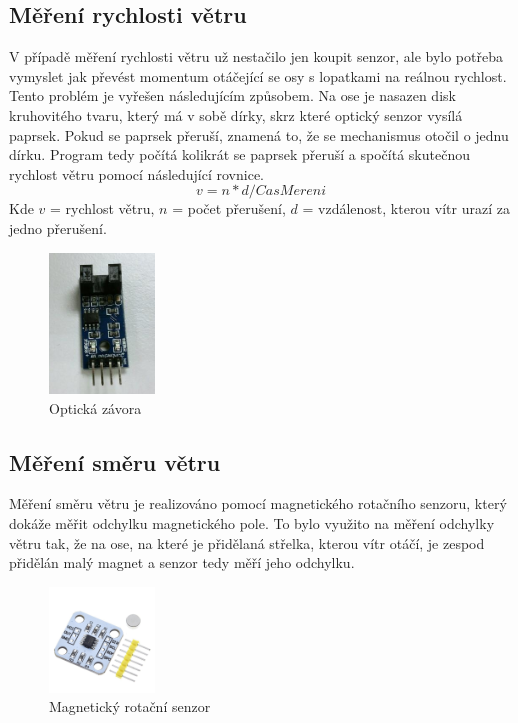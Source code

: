 \subsection{Měření rychlosti větru}
V případě měření rychlosti větru už nestačilo jen koupit senzor, ale bylo potřeba vymyslet jak převést momentum otáčející se osy s lopatkami na reálnou rychlost.
Tento problém je vyřešen následujícím způsobem. Na ose je nasazen disk kruhovitého tvaru, který má v sobě dírky, skrz které optický senzor vysílá paprsek.
Pokud se paprsek přeruší,
znamená to, že se mechanismus otočil o jednu dírku. Program tedy počítá kolikrát se paprsek přeruší a spočítá skutečnou rychlost větru pomocí následující rovnice.
\begin{equation}
v = n * d / CasMereni 
\end{equation}
Kde $v$ = rychlost větru, $n$ = počet přerušení, $d$ = vzdálenost, kterou vítr urazí za jedno přerušení.

\begin{figure}[h] 
    \centering
    \includegraphics[width=0.25\textwidth]{images/ir_sensor.png}
    \caption{Optická závora}
\end{figure}

\subsection{Měření směru větru}
Měření směru větru je realizováno pomocí magnetického rotačního senzoru, který dokáže měřit odchylku magnetického pole. To bylo využito na měření odchylky větru tak, že na ose, na které je přidělaná střelka, kterou vítr otáčí, je zespod přidělán
malý magnet a senzor tedy měří jeho odchylku.

\begin{figure}[h] 
    \centering
    \includegraphics[width=0.25\textwidth]{images/AS5600.jpg}
    \caption{Magnetický rotační senzor}
\end{figure}

